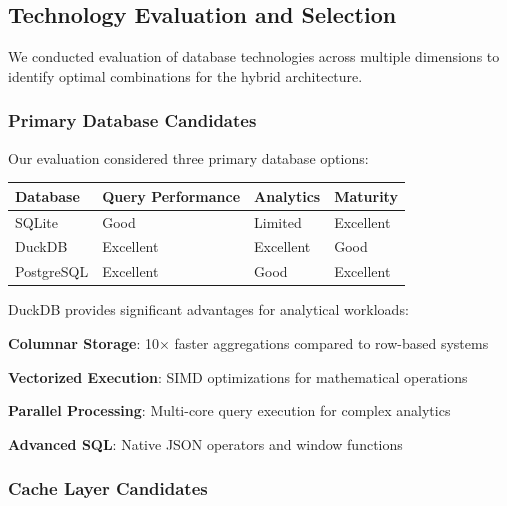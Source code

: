 \subsection*{Technology Evaluation and Selection}

We conducted evaluation of database technologies across multiple dimensions to identify optimal combinations for the hybrid architecture.

\subsubsection*{Primary Database Candidates}

Our evaluation considered three primary database options:

\begin{center}
\begin{tabular}{@{}llll@{}}
\toprule
\textbf{Database} & \textbf{Query Performance} & \textbf{Analytics} & \textbf{Maturity} \\
\midrule
SQLite & Good & Limited & Excellent \\
DuckDB & Excellent & Excellent & Good \\
PostgreSQL & Excellent & Good & Excellent \\
\bottomrule
\end{tabular}
\end{center}

\begin{infobox}[title=DuckDB Advantages for Analytics]
DuckDB provides significant advantages for analytical workloads:
\begin{compactlist}
    \item \textbf{Columnar Storage}: 10× faster aggregations compared to row-based systems
    \item \textbf{Vectorized Execution}: SIMD optimizations for mathematical operations
    \item \textbf{Parallel Processing}: Multi-core query execution for complex analytics
    \item \textbf{Advanced SQL}: Native JSON operators and window functions
\end{compactlist}
\end{infobox}

\subsubsection*{Cache Layer Candidates}

